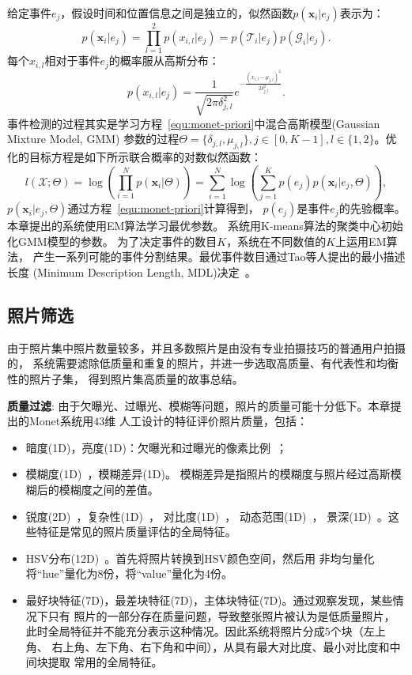 \documentclass[doctor]{ustcthesis}
\def \x {\mathbf{x}}
\def \X {\mathcal{X}}
\begin{document}
给定事件$e_j$，假设时间和位置信息之间是独立的，似然函数$p(\x_i|e_j)$表示为：
\begin{equation}
    \label{equ:monet-priori}
    p(\x_i|e_j)= \prod_{l=1}^{2}p(x_{i,l}|e_j) = p(\mathcal{T}_i | e_j)p(\mathcal{G}_i | e_j).
\end{equation}
每个$x_{i,l}$相对于事件$e_j$的概率服从高斯分布：
\begin{equation}
    p(x_{i,l}|e_j) =
    \frac{1}{\sqrt{2\pi\delta_{j,l}^2}}e^{-\frac{(x_{i,l}-\mu_{j,l})^2}{2\delta_{j,l}^2}}.
\end{equation}
事件检测的过程其实是学习方程~\eqref{equ:monet-priori}中混合高斯模型(Gaussian Mixture Model, GMM)
参数的过程$\Theta=\{\delta_{j,l}, \mu_{j,l}\}, j\in[0,K-1], l\in\{1,2\}$。优化的目标方程是如下所示联合概率的对数似然函数：
\begin{equation}
    \label{equ:monet-likeli}
    l(\X;\Theta)= \log(\prod_{i=1}^N p(\x_i|\Theta)) =
    \sum_{i=1}^N \log(\sum_{j=1}^K p(e_j)p(\x_i|e_j,\Theta)),
\end{equation}
$p(\x_i|e_j,\Theta)$通过方程~\eqref{equ:monet-priori}计算得到，
$p(e_j)$是事件$e_j$的先验概率。本章提出的系统使用EM算法学习最优参数。
系统用K-means算法的聚类中心初始化GMM模型的参数。
为了决定事件的数目$K$，系统在不同数值的$K$上运用EM算法，
产生一系列可能的事件分割结果。最优事件数目通过Tao等人提出的最小描述长度
(Minimum Description Length, MDL)决定~\cite{mei2006probabilistic}。

\subsection{照片筛选}
由于照片集中照片数量较多，并且多数照片是由没有专业拍摄技巧的普通用户拍摄的，
系统需要滤除低质量和重复的照片，并进一步选取高质量、有代表性和均衡性的照片子集，
得到照片集高质量的故事总结。

\textbf{质量过滤}:
由于欠曝光、过曝光、模糊等问题，照片的质量可能十分低下。本章提出的Monet系统用$43$维
人工设计的特征评价照片质量，包括：
\begin{itemize}\setlength{\itemsep}{0pt}
    \item 暗度(1D)，亮度(1D)：欠曝光和过曝光的像素比例~\cite{qa_bright}；
    \item 模糊度(1D)~\cite{qa_blur}，模糊差异(1D)。
        模糊差异是指照片的模糊度与照片经过高斯模糊后的模糊度之间的差值。
    \item 锐度(2D)~\cite{qa_blur,qa_sharpness}，复杂性(1D)~\cite{qa_sim}，
        对比度(1D)~\cite{qa_dyn_range}， 动态范围(1D)~\cite{qa_dyn_range}，
        景深(1D)~\cite{qa_zhedong}。这些特征是常见的照片质量评估的全局特征。
    \item HSV分布(12D)~\cite{qa_hsv}。首先将照片转换到HSV颜色空间，然后用
        非均匀量化将``hue''量化为8份，将``value''量化为4份。
    \item 最好块特征(7D)，最差块特征(7D)，主体块特征(7D)。通过观察发现，某些情况下只有
        照片的一部分存在质量问题，导致整张照片被认为是低质量照片，
        此时全局特征并不能充分表示这种情况。因此系统将照片分成$5$个块（左上角、
        右上角、左下角、右下角和中间），从具有最大对比度、最小对比度和中间块提取
        常用的全局特征。
\end{itemize}
\end{document}
